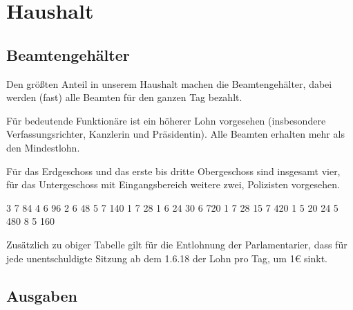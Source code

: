 \documentclass{sasbase}
\begin{document}
\newpage

\section{Haushalt}

\subsection{Beamtengehälter}

Den größten Anteil in unserem Haushalt machen die Beamtengehälter, dabei werden (fast) alle
Beamten für den ganzen Tag bezahlt.

Für bedeutende Funktionäre ist ein höherer Lohn vorgesehen (insbesondere Verfassungsrichter, Kanzlerin und Präsidentin). Alle Beamten erhalten mehr als den Mindestlohn.

Für das Erdgeschoss und das erste bis dritte Obergeschoss sind insgesamt vier, für das Untergeschoss
mit Eingangsbereich weitere zwei, Polizisten vorgesehen.

\vspace{5mm}

\begin{lohnrechnung}
        {3}  {7} {84}
        {4}  {6} {96}
              {2}  {6} {48}
                  {5}  {7} {140}
                 {1}  {7} {28}
               {1}  {6} {24}
               {30} {6} {720}
     {1}  {7} {28}
           {15} {7} {420}
               {1}  {5} {20}
            {24} {5} {480}
                      {8}  {5} {160}
\end{lohnrechnung}

\addtocounter{beamten}{\thetotal}

\vspace{5mm}

Zusätzlich zu obiger Tabelle gilt für die Entlohnung der Parlamentarier, dass für jede
unentschuldigte Sitzung ab dem 1.6.18 der Lohn pro Tag, um 1€ sinkt.

\subsection{Ausgaben}

\begin{kostenrechnung}
\end{kostenrechnung}
\end{document}
